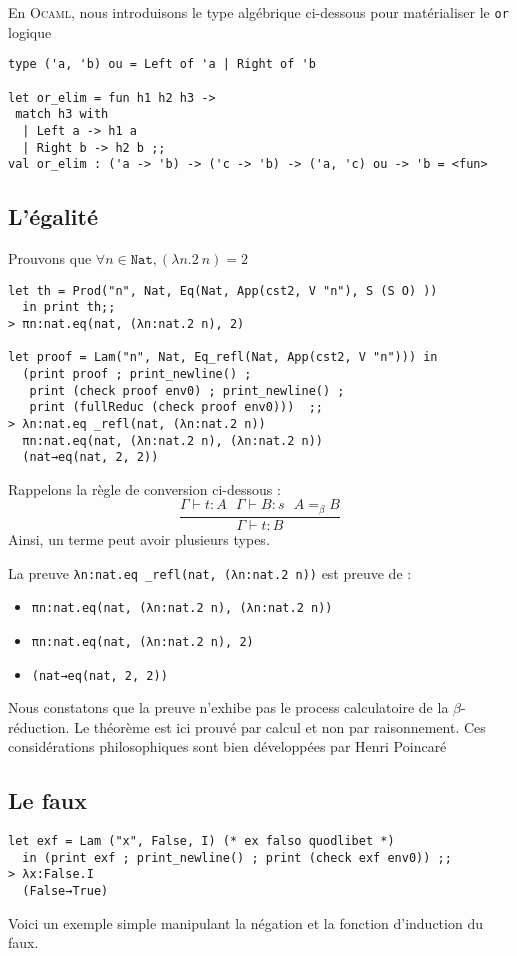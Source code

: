 En \textsc{Ocaml}, nous introduisons le type algébrique ci-dessous pour matérialiser le \verb+or+ logique
\begin{Verbatim}
type ('a, 'b) ou = Left of 'a | Right of 'b	

let or_elim = fun h1 h2 h3 ->
 match h3 with
  | Left a -> h1 a
  | Right b -> h2 b ;;
val or_elim : ('a -> 'b) -> ('c -> 'b) -> ('a, 'c) ou -> 'b = <fun>
\end{Verbatim}

\subsection{L'égalité}
Prouvons que $\forall n \in \mathtt{Nat}, (\lambda n.2\  n) = 2$
\begin{Verbatim}
let th = Prod("n", Nat, Eq(Nat, App(cst2, V "n"), S (S O) )) 
  in print th;;
> πn:nat.eq(nat, (λn:nat.2 n), 2)

let proof = Lam("n", Nat, Eq_refl(Nat, App(cst2, V "n"))) in 
  (print proof ; print_newline() ;
   print (check proof env0) ; print_newline() ; 
   print (fullReduc (check proof env0)))  ;;
> λn:nat.eq _refl(nat, (λn:nat.2 n))
  πn:nat.eq(nat, (λn:nat.2 n), (λn:nat.2 n))
  (nat→eq(nat, 2, 2))
\end{Verbatim}
Rappelons la règle de conversion ci-dessous :
$$
\frac{\Gamma ⊢ t:A \ \ \     \Gamma ⊢ B:s \ \ \     A=_\beta B}{\Gamma ⊢ t:B}
$$
Ainsi, un terme peut avoir plusieurs types.

\noindent La preuve \verb+λn:nat.eq _refl(nat, (λn:nat.2 n))+ est preuve de :
\begin{itemize}
 \item \verb+πn:nat.eq(nat, (λn:nat.2 n), (λn:nat.2 n))+
 \item \verb+πn:nat.eq(nat, (λn:nat.2 n), 2)+
 \item \verb+(nat→eq(nat, 2, 2))+
\end{itemize}
Nous constatons que la preuve n'exhibe pas le process calculatoire de la $\beta$-réduction.
Le théorème est ici prouvé par calcul et non par raisonnement. Ces considérations philosophiques sont bien développées
par Henri Poincaré\cite{poincare}

\subsection{Le faux}

\begin{Verbatim}
let exf = Lam ("x", False, I) (* ex falso quodlibet *)
  in (print exf ; print_newline() ; print (check exf env0)) ;;
> λx:False.I
  (False→True) 
\end{Verbatim}
Voici un exemple simple manipulant la négation et la fonction d'induction du faux.  

